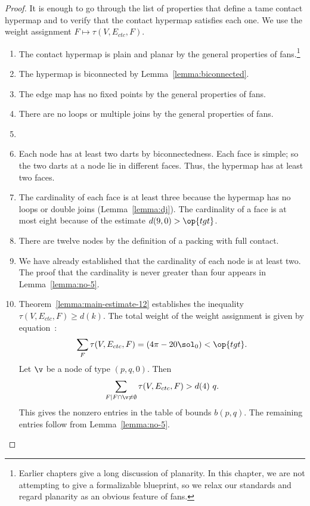 \begin{proof} It is enough to go through the list of properties that
  define a tame contact hypermap and to verify that the contact
  hypermap satisfies each one.  We use the weight assignment $F\mapsto
  \tau(V,E_{ctc},F)$.

\begin{enumerate}
\item {} The contact hypermap is plain and planar by the
  general properties of fans.\footnote{Earlier chapters give a long
    discussion of planarity.  In this chapter, we are not attempting
    to give a formalizable blueprint, so we relax our standards and
    regard planarity as an obvious feature of fans.}
\item {} The hypermap is biconnected by
  Lemma~\ref{lemma:biconnected}.
\item {} The
  edge map has no fixed points by the general properties of fans.
\item {}
  There are no loops or multiple joins by the general properties of
  fans.
\item {} 
\item {} Each node has at least two darts by
  biconnectedness. Each face is simple; so the two darts at a node lie
  in different faces.  Thus, the hypermap has at least two faces.
\item {} The cardinality of each face is at least three
  because the hypermap has no loops or double joins (Lemma~\ref{lemma:dj}).
  The cardinality of a face is at most eight because of the estimate
  $d(9,0)>\op{tgt}$.
\item {} There are twelve nodes by the definition of a
  packing with full contact.
\item {} We have already established that the cardinality
  of each node is at least two.  The proof that the cardinality is
  never  greater than four appears in Lemma~\ref{lemma:no-5}.
\item {} Theorem~\ref{lemma:main-estimate-12} establishes 
 the inequality $\tau(V,E_{ctc},F)\ge d(k)$.
  The total weight of the weight assignment is given by
  equation~:
\[
  \sum_F \tau(V,E_{ctc},F) = (4\pi - 20\sol_0) < \op{tgt}.
\]
%
Let $\v$ be a node of type $(p,q,0)$.  
Then
\[
\sum_{F\mid F\cap \v\ne\emptyset}\tau(V,E_{ctc},F) > d(4)~q.
\]
This gives the nonzero entries in the table of bounds $b(p,q)$.  The
remaining entries follow from Lemma~\ref{lemma:no-5}.
\end{enumerate}
\end{proof}




